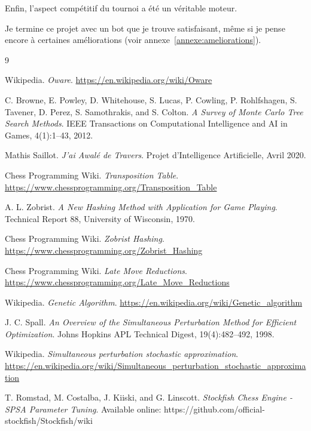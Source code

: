 \documentclass[11pt,a4paper]{article}
\begin{document}
Enfin, l'aspect compétitif du tournoi a été un véritable moteur.

Je termine ce projet avec un bot que je trouve satisfaisant, même si je pense encore à certaines améliorations (voir annexe~\ref{annexe:ameliorations}).


\clearpage
{}
{}
\begin{thebibliography}{9}

Wikipedia.
\textit{Oware}.
\url{https://en.wikipedia.org/wiki/Oware}

C. Browne, E. Powley, D. Whitehouse, S. Lucas, P. Cowling,
P. Rohlfshagen, S. Tavener, D. Perez, S. Samothrakis, and S. Colton.
\textit{A Survey of Monte Carlo Tree Search Methods}.
IEEE Transactions on Computational Intelligence and AI in Games,
4(1):1--43, 2012.

Mathis Saillot.
\textit{J'ai Awalé de Travers}.
Projet d'Intelligence Artificielle, Avril 2020.

Chess Programming Wiki.
\textit{Transposition Table}.
\url{https://www.chessprogramming.org/Transposition_Table}

A. L. Zobrist.
\textit{A New Hashing Method with Application for Game Playing}.
Technical Report 88, University of Wisconsin, 1970.

Chess Programming Wiki.
\textit{Zobrist Hashing}.
\url{https://www.chessprogramming.org/Zobrist_Hashing}

Chess Programming Wiki.
\textit{Late Move Reductions}.
\url{https://www.chessprogramming.org/Late_Move_Reductions}

Wikipedia.
\textit{Genetic Algorithm}.
\url{https://en.wikipedia.org/wiki/Genetic_algorithm}

J. C. Spall.
\textit{An Overview of the Simultaneous Perturbation Method for Efficient Optimization}.
Johns Hopkins APL Technical Digest, 19(4):482--492, 1998.

Wikipedia.
\textit{Simultaneous perturbation stochastic approximation}.
\url{https://en.wikipedia.org/wiki/Simultaneous_perturbation_stochastic_approximation}

T. Romstad, M. Costalba, J. Kiiski, and G. Linscott.
\textit{Stockfish Chess Engine - SPSA Parameter Tuning}.
Available online: https://github.com/official-stockfish/Stockfish/wiki


\end{thebibliography}
\end{document}
